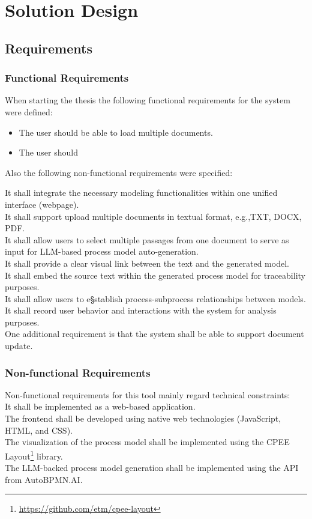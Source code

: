 \chapter{Solution Design}
\label{sec:solution}

\section{Requirements}
\label{sec:solution:req}
\subsection{Functional Requirements}

When starting the thesis the following functional requirements for the system were defined:

\begin{itemize}
    \item The user should be able to load multiple documents.
    \item The user should 
\end{itemize}

Also the following non-functional requirements were specified:

It shall integrate the necessary modeling functionalities within one unified interface (webpage).\\
It shall support upload multiple documents in textual format, e.g.,TXT, DOCX, PDF.\\
It shall allow users to select multiple passages from one document to serve as input for LLM-based process model auto-generation. \\
It shall provide a clear visual link between the text and the generated model.\\
It shall embed the source text within the generated process model for traceability purposes.\\
It shall allow users to e§stablish process-subprocess relationships between models.\\
It shall record user behavior and interactions with the system for analysis purposes.\\
One additional requirement is that the system shall be able to support document update.
\subsection{Non-functional Requirements}
Non-functional requirements for this tool mainly regard technical constraints:\\
It shall be implemented as a web-based application.\\
The frontend shall be developed using native web technologies (JavaScript, HTML, and CSS).\\
The visualization of the process model shall be implemented using the CPEE Layout\footnote{\url{https://github.com/etm/cpee-layout}} library.\\
The LLM-backed process model generation shall be implemented using the API from AutoBPMN.AI.\\

